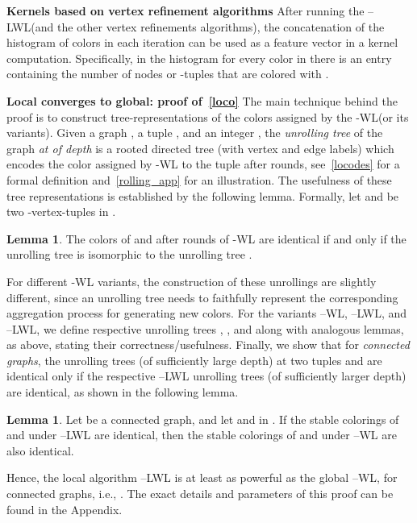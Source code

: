 \documentclass{article}
\newcommand{\xhdr}[1]{{\noindent\bfseries #1}}
\theoremstyle{definition}
\newtheorem{lemma}[theorem]{Lemma}
\newcommand{\new}[1]{\emph{#1}}
\newcommand{\kwl}{-\textsf{WL}\xspace}
\newcommand{\deltakwl}{--\textsf{WL}\xspace}
\newcommand{\localkwl}{--\textsf{LWL}\xspace}
\newcommand{\pluskwl}{--\textsf{LWL}\xspace}
\begin{document}
\xhdr{Kernels based on vertex refinement algorithms}
After running the \localkwl (and the other vertex refinements algorithms), the concatenation of the histogram of colors in each iteration can be used as a feature vector in a kernel computation. 
Specifically, in the histogram for every color  in  there is an entry containing the number of nodes or -tuples that are colored with .

\xhdr{Local converges to global: proof of~\cref{loco}} The main technique behind the proof is to construct tree-representations of the colors assigned by the \kwl (or its variants). Given a graph , a tuple , and an integer , the \emph{unrolling tree} of the graph  \new{at  of depth } is a rooted directed tree  (with vertex and edge labels) which encodes the color assigned by \kwl to the tuple  after  rounds, see~\cref{locodes} for a formal definition and~\cref{rolling_app} for an illustration. The usefulness of these tree representations is established by the following lemma. Formally, let  and  be two -vertex-tuples in .
\begin{lemma}\label{encwl}
	The colors of  and  after  rounds of \kwl are identical if and only if the unrolling tree  is isomorphic to the unrolling tree .  
\end{lemma}
For different \kwl variants, the construction of these unrollings are slightly different, since an unrolling tree needs to faithfully represent the corresponding aggregation process for generating new colors. For the variants \deltakwl, \localkwl, and \pluskwl, we define respective unrolling trees , , and  along with analogous lemmas, as above, stating their correctness/usefulness. Finally, we show that for \emph{connected graphs}, the  unrolling trees (of sufficiently large depth) at two tuples  and  are identical only if the respective \pluskwl unrolling trees (of sufficiently larger depth) are identical, as shown in the following lemma. 
\begin{lemma}\label{pluseqtodelta}
	Let  be a connected graph, and let  and  in . If the stable colorings of  and  under \pluskwl are identical, 
	then the stable colorings of  and  under \deltakwl are also identical. 
\end{lemma}
Hence, the local algorithm \pluskwl is at least as powerful as the global \deltakwl, for connected graphs, i.e., . 
The exact details and parameters of this proof can be found in the Appendix.
\end{document}
